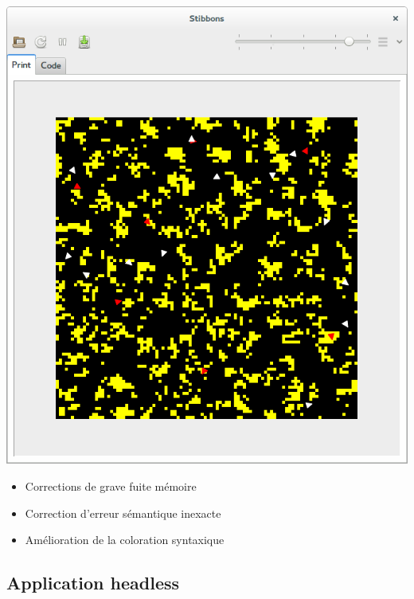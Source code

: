 \begin{frame}
\begin{center}
\includegraphics[scale=0.16]{doc/report/screenshot/stibbons-0-5-3.png}
\end{center}

\begin{itemize}
	\item Corrections de grave fuite mémoire
	\item Correction d'erreur sémantique inexacte
	\item Amélioration de la coloration syntaxique
\end{itemize}
\end{frame}

\subsection{Application headless}

